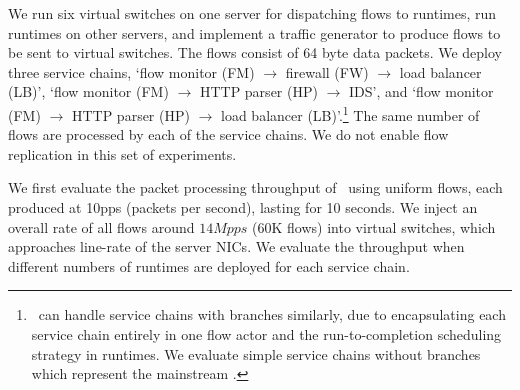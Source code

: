 
We run six virtual switches on one server for dispatching flows to runtimes, run runtimes on other servers, and implement a traffic generator to produce flows to be sent to virtual switches. The flows consist of 64 byte data packets. We deploy three service chains, `flow monitor (FM) $\rightarrow$ firewall (FW) $\rightarrow$ load balancer (LB)', `flow monitor (FM) $\rightarrow$ HTTP parser (HP) $\rightarrow$ IDS', and `flow monitor (FM) $\rightarrow$ HTTP parser (HP) $\rightarrow$ load balancer (LB)'.\footnote{\nfactor~can handle service chains with branches similarly, due to encapsulating each service chain entirely in one flow actor and the run-to-completion scheduling strategy in runtimes. We evaluate simple service chains without branches which represent the mainstream \cite{hwang2015netvm, martins2014clickos}.} The same number of flows are processed by each of the service chains. We do not enable flow replication in this set of experiments. %


We first evaluate the packet processing throughput of \nfactor~using uniform flows, each produced at 10pps (packets per second), lasting for 10 seconds. We inject an overall rate of all flows around $14Mpps$ (60K flows) into virtual switches, %
 which approaches line-rate of the server NICs. We evaluate the throughput when different numbers of runtimes are deployed for each service chain. %

